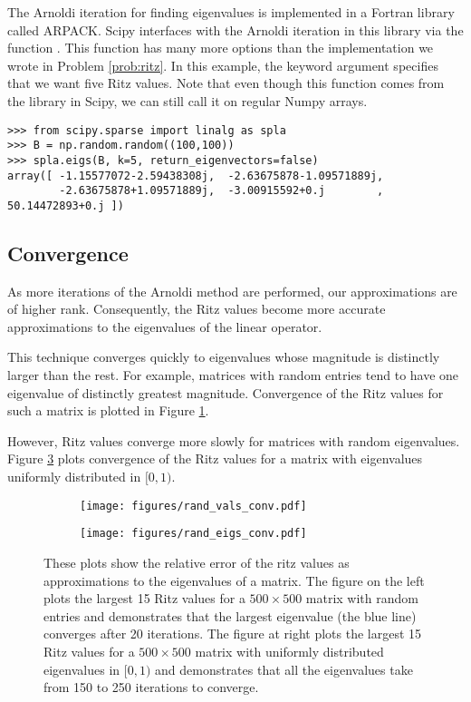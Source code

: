 The Arnoldi iteration for finding eigenvalues is implemented in a Fortran library called ARPACK.
Scipy interfaces with the Arnoldi iteration in this library via the function .
This function has many more options than the implementation we wrote in Problem \ref{prob:ritz}.
In this example, the keyword argument  specifies that we want five Ritz values.
Note that even though this function comes from the  library in Scipy, we can still call it on regular Numpy arrays.

\begin{lstlisting}
>>> from scipy.sparse import linalg as spla
>>> B = np.random.random((100,100))
>>> spla.eigs(B, k=5, return_eigenvectors=false)
array([ -1.15577072-2.59438308j,  -2.63675878-1.09571889j,
        -2.63675878+1.09571889j,  -3.00915592+0.j        ,  50.14472893+0.j ])
\end{lstlisting}

\subsection*{Convergence} %
As more iterations of the Arnoldi method are performed, our approximations are of higher rank.
Consequently, the Ritz values become more accurate approximations to the eigenvalues of the linear operator.

This technique converges quickly to eigenvalues whose magnitude is distinctly larger than the rest.
For example, matrices with random entries tend to have one eigenvalue of distinctly greatest magnitude.
Convergence of the Ritz values for such a matrix is plotted in Figure \ref{fig:arnoldi_random_val_conv}.

However, Ritz values converge more slowly for matrices with random eigenvalues.
Figure \ref{fig:arnoldi_random_eig_conv} plots convergence of the Ritz values for a matrix with eigenvalues uniformly distributed in $[0,1)$.

\begin{figure}
\centering
\begin{subfigure}[b]{.49\textwidth}
    \centering
    \texttt{[image: figures/rand\_vals\_conv.pdf]}
    \caption{}
    \label{fig:arnoldi_random_val_conv}
\end{subfigure}
\begin{subfigure}[b]{.49\textwidth}
    \centering
    \texttt{[image: figures/rand\_eigs\_conv.pdf]}
    \caption{}
    \label{fig:arnoldi_random_eig_conv}
\end{subfigure}
\caption{These plots show the relative error of the ritz values as approximations to the eigenvalues of a matrix.
The figure on the left plots the largest 15 Ritz values for a $500\times 500$ matrix with random entries and demonstrates that the largest eigenvalue (the blue line) converges after 20 iterations.
The figure at right plots the largest 15 Ritz values for a $500\times 500$ matrix with uniformly distributed eigenvalues in $[0,1)$ and demonstrates that all the eigenvalues take from 150 to 250 iterations to converge.}
\end{figure}


